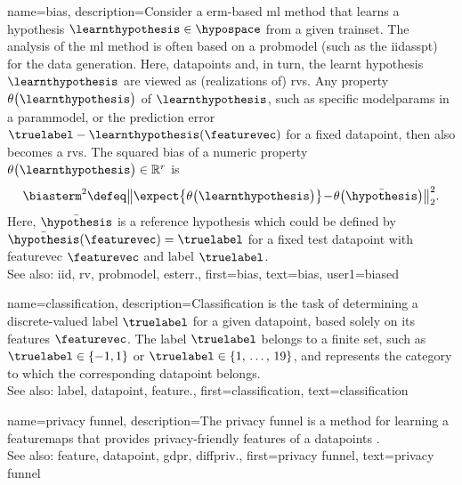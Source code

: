 {name={bias},
	description={Consider a \gls{erm}-based \gls{ml} method that  
				 learns a \gls{hypothesis} $\learnthypothesis \in \hypospace$ 
				 from a given \gls{trainset}. The analysis of the \gls{ml} method 
				 is often based on a \gls{probmodel} (such as the \gls{iidasspt}) 
				 for the \gls{data} generation. Here, \glspl{datapoint} and, in turn, 
				 the learnt \gls{hypothesis} $\learnthypothesis$ are viewed as 
				 (\glspl{realization} of) \glspl{rv}. Any property 
				 $\theta\big(\learnthypothesis\big)$ of $\learnthypothesis$, 
				 such as specific \glspl{modelparam} in a \gls{parammodel}, 
				 or the \gls{prediction} error $\truelabel - \learnthypothesis(\featurevec)$ 
				 for a fixed \gls{datapoint}, then also becomes a \glspl{rv}. 
				 The squared bias of a numeric property $\theta\big(\learnthypothesis\big) \in \mathbb{R}^{r}$ 
				 is \cite{hastie01statisticallearning,BishopBook}
				 $$\biasterm^{2} \defeq \big\| \expect \big\{ \theta\big(\learnthypothesis\big) \big\}\!-\!\theta\big(\bar{\hypothesis}\big)  \big\|_{2}^{2}.$$
				 Here, $\bar{\hypothesis}$ is a reference \gls{hypothesis} which 
				 could be defined by $\bar{\hypothesis}(\featurevec)=\truelabel$ 
				 for a fixed test \gls{datapoint} with \gls{featurevec} $\featurevec$ 
				 and \gls{label} $\truelabel$. 
					\\ 
		See also: \gls{iid}, \gls{rv}, \gls{probmodel}, \gls{esterr}.},
	first={bias},
	text={bias},
	user1={biased}
}

{name={classification},
	description={Classification is the task of determining a 
 		discrete-valued \gls{label} $\truelabel$ for a given \gls{datapoint}, based solely on its 
 		\glspl{feature} $\featurevec$. The \gls{label} $\truelabel$ belongs to a finite set, such as 
 		$\truelabel \in \{-1,1\}$ or $\truelabel \in \{1, \,\ldots, \,19\}$, and represents the 
 		category to which the corresponding \gls{datapoint} belongs.
				\\ 
		See also: \gls{label}, \gls{datapoint}, \gls{feature}.},
	first={classification},
	text={classification} 
}


{name={privacy funnel},
	description={The privacy funnel is a method for learning 
	a \glspl{featuremap} that provides privacy-friendly \glspl{feature} of a 
	\glspl{datapoint} \cite{PrivacyFunnel}.
				\\ 
		See also: \gls{feature}, \gls{datapoint}, \gls{gdpr}, \gls{diffpriv}.},
 	first={privacy funnel},
	text={privacy funnel} 
}


